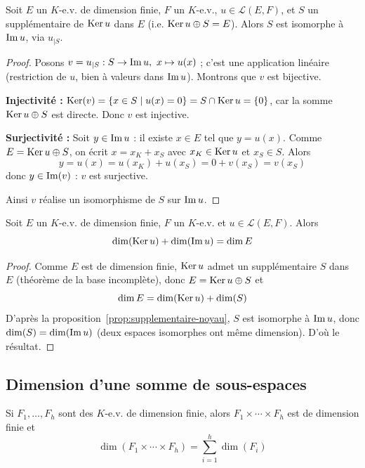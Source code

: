 \begin{prop}
\label{prop:supplementaire-noyau}
Soit $E$ un $K$-e.v. de dimension finie, $F$ un $K$-e.v., $u\in\mathcal{L}(E,F)$, et $S$ un supplémentaire de $\operatorname{Ker} u$ dans $E$ (i.e. $\operatorname{Ker} u\oplus S = E$). Alors $S$ est isomorphe à $\operatorname{Im} u$, via $u_{|S}$.
\end{prop}

\begin{proof}
Posons $v = u_{|S} : S\to\operatorname{Im} u,\ x\mapsto u(x)$ ; c'est une application linéaire (restriction de $u$, bien à valeurs dans $\operatorname{Im} u$). Montrons que $v$ est bijective.

\textbf{Injectivité :} $\operatorname{Ker}(v) = \{x\in S \mid u(x)=0\} = S\cap\operatorname{Ker} u = \{0\}$, car la somme $\operatorname{Ker} u\oplus S$ est directe. Donc $v$ est injective.

\textbf{Surjectivité :} Soit $y\in\operatorname{Im} u$ : il existe $x\in E$ tel que $y=u(x)$. Comme $E=\operatorname{Ker} u\oplus S$, on écrit $x=x_K+x_S$ avec $x_K\in\operatorname{Ker} u$ et $x_S\in S$. Alors
\[y = u(x) = u(x_K)+u(x_S) = 0+v(x_S) = v(x_S)\]
donc $y\in\operatorname{Im}(v)$ : $v$ est surjective.

Ainsi $v$ réalise un isomorphisme de $S$ sur $\operatorname{Im} u$.
\end{proof}

\begin{theo}
\label{theo:rang}
Soit $E$ un $K$-e.v. de dimension finie, $F$ un $K$-e.v. et $u\in\mathcal{L}(E,F)$. Alors
\[\dim(\operatorname{Ker} u) + \dim(\operatorname{Im} u) = \dim E\]
\end{theo}

\begin{proof}
Comme $E$ est de dimension finie, $\operatorname{Ker} u$ admet un supplémentaire $S$ dans $E$ (théorème de la base incomplète), donc $E=\operatorname{Ker} u\oplus S$ et
\[\dim E = \dim(\operatorname{Ker} u) + \dim(S)\]
D'après la proposition~\ref{prop:supplementaire-noyau}, $S$ est isomorphe à $\operatorname{Im} u$, donc $\dim(S)=\dim(\operatorname{Im} u)$ (deux espaces isomorphes ont même dimension). D'où le résultat.
\end{proof}

\subsection{Dimension d'une somme de sous-espaces}

\begin{prop}
\label{prop:dim-produit}
Si $F_1,\dots,F_h$ sont des $K$-e.v. de dimension finie, alors $F_1\times\cdots\times F_h$ est de dimension finie et
\[\dim(F_1\times\cdots\times F_h) = \sum_{i=1}^h \dim(F_i)\]
\end{prop}

